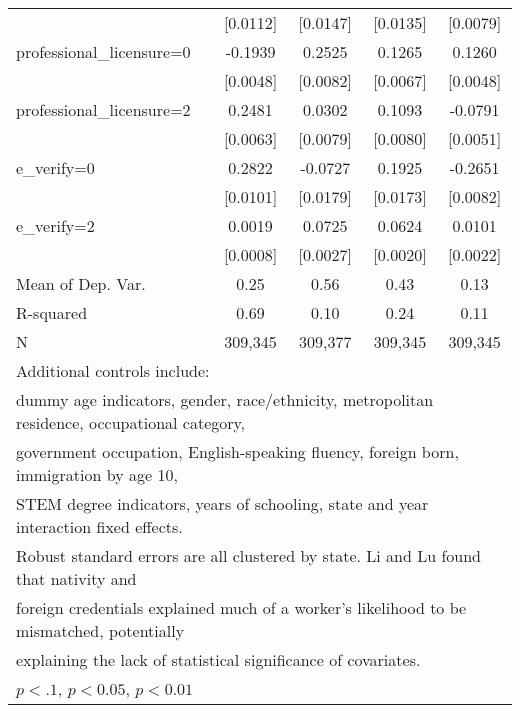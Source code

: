 \begin{table}[htbp]
\begin{tabular}{l*{4}{c}}
                    &    [0.0112]         &    [0.0147]         &    [0.0135]         &    [0.0079]         \\
\addlinespace
professional\_licensure=0&     -0.1939\sym{***}&      0.2525\sym{***}&      0.1265\sym{***}&      0.1260\sym{***}\\
                    &    [0.0048]         &    [0.0082]         &    [0.0067]         &    [0.0048]         \\
\addlinespace
professional\_licensure=2&      0.2481\sym{***}&      0.0302\sym{***}&      0.1093\sym{***}&     -0.0791\sym{***}\\
                    &    [0.0063]         &    [0.0079]         &    [0.0080]         &    [0.0051]         \\
\addlinespace
e\_verify=0          &      0.2822\sym{***}&     -0.0727\sym{***}&      0.1925\sym{***}&     -0.2651\sym{***}\\
                    &    [0.0101]         &    [0.0179]         &    [0.0173]         &    [0.0082]         \\
\addlinespace
e\_verify=2          &      0.0019\sym{**} &      0.0725\sym{***}&      0.0624\sym{***}&      0.0101\sym{***}\\
                    &    [0.0008]         &    [0.0027]         &    [0.0020]         &    [0.0022]         \\
\midrule
Mean of Dep. Var.   &        0.25         &        0.56         &        0.43         &        0.13         \\
R-squared           &        0.69         &        0.10         &        0.24         &        0.11         \\
N                   &     309,345         &     309,377         &     309,345         &     309,345         \\
\bottomrule
\multicolumn{5}{l}{\footnotesize Additional controls include:}\\
\multicolumn{5}{l}{\footnotesize dummy age indicators, gender, race/ethnicity, metropolitan residence, occupational category,}\\
\multicolumn{5}{l}{\footnotesize government occupation, English-speaking fluency, foreign born, immigration by age 10,}\\
\multicolumn{5}{l}{\footnotesize STEM degree indicators, years of schooling, state and year interaction fixed effects.}\\
\multicolumn{5}{l}{\footnotesize Robust standard errors are all clustered by state. Li and Lu found that nativity and}\\
\multicolumn{5}{l}{\footnotesize foreign credentials explained much of a worker's likelihood to be mismatched, potentially}\\
\multicolumn{5}{l}{\footnotesize explaining the lack of statistical significance of covariates.}\\
\multicolumn{5}{l}{\footnotesize \sym{*} \(p<.1\), \sym{**} \(p<0.05\), \sym{***} \(p<0.01\)}\\
\end{tabular}
\end{table}
